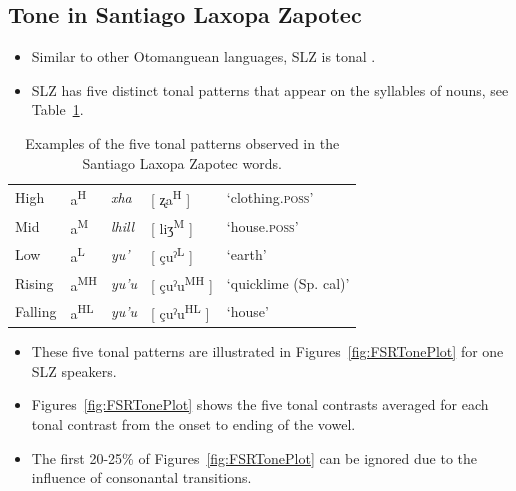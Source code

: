 \documentclass[12pt, letterpaper]{article}
\newcommand{\supr}[1]{\textsuperscript{#1}}
\providecommand{\lsptoprule}{\midrule\toprule}
\providecommand{\lspbottomrule}{\bottomrule\midrule}
\begin{document}
\subsection{Tone in Santiago Laxopa Zapotec} \label{sec:Tone}

\begin{itemize}
    \item Similar to other Otomanguean languages, SLZ is tonal \citep{suarezMesoamericanIndianLanguages1983,campbellMesoAmericaLinguisticArea1986,silvermanLaryngealComplexityOtomanguean1997,campbellOtomangueanHistoricalLinguistics2017a,campbellOtomangueanHistoricalLinguistics2017}.
    \item SLZ has five distinct tonal patterns that appear on the syllables of nouns, see Table~\ref{tab:tones}. 
\end{itemize}

\begin{table}[!h]
	\centering
	\caption{Examples of the five tonal patterns observed in the Santiago Laxopa Zapotec words.}
	\label{tab:tones}
	\begin{tabular}{lllll}
	\lsptoprule
	High   	&  a\supr{H}  &  \textit{xha}   &  [ ʐa\supr{H} ] & `clothing.\textsc{poss}'\\
	Mid    	&  a\supr{M}  &  \textit{lhill} 	& [ liʒ\supr{M} ] & `house.\textsc{poss}' \\
	Low   	&  a\supr{L}  &  \textit{yu'} 	&	 [ çuˀ\supr{L} ] & `earth'\\
	Rising	&  a\supr{MH}  &  \textit{yu'u} 	&	[ çuˀu\supr{MH} ] & `quicklime (Sp. cal)' \\
	Falling &  a\supr{HL}  &  \textit{yu'u}  &	[ çuˀu\supr{HL} ] &	`house' \\
	\lspbottomrule
	\end{tabular}
\end{table}

\begin{itemize}
	\item These five tonal patterns are illustrated in Figures~\ref{fig:FSRTonePlot} for one SLZ speakers. 
	\item Figures~\ref{fig:FSRTonePlot} shows the five tonal contrasts averaged for each tonal contrast from the onset to ending of the vowel. 
	\item The first 20-25\% of Figures~\ref{fig:FSRTonePlot} can be ignored due to the influence of consonantal transitions. 
\end{itemize}
\end{document}
